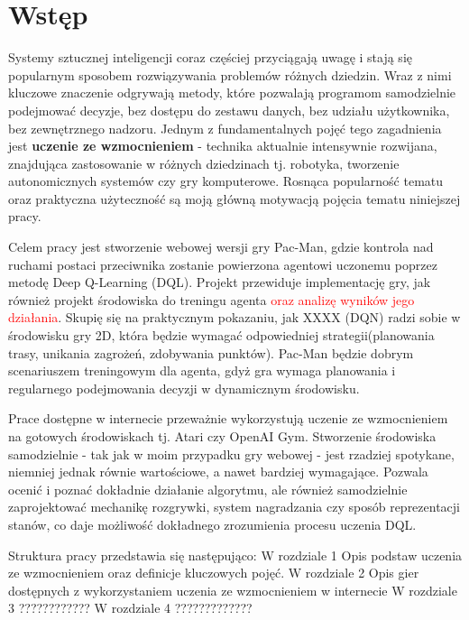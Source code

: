 \documentclass{iiuwb}
\begin{document}
\tableofcontents
\cleardoublepage
\chapter*{Wstęp}
\label{cha:Wstep}

Systemy sztucznej inteligencji coraz częściej przyciągają uwagę i stają się popularnym sposobem rozwiązywania problemów różnych dziedzin. Wraz z nimi kluczowe znaczenie odgrywają metody, które pozwalają programom samodzielnie podejmować decyzje, bez dostępu do zestawu danych, bez udziału użytkownika, bez zewnętrznego nadzoru. Jednym z fundamentalnych pojęć tego zagadnienia jest \textbf{uczenie ze wzmocnieniem} - technika aktualnie intensywnie rozwijana, znajdująca zastosowanie w różnych dziedzinach tj. robotyka, tworzenie autonomicznych systemów czy gry komputerowe. Rosnąca popularność tematu oraz praktyczna użyteczność są moją główną motywacją pojęcia tematu niniejszej pracy.

Celem pracy jest stworzenie webowej wersji gry Pac-Man, gdzie kontrola nad ruchami postaci przeciwnika zostanie powierzona agentowi uczonemu poprzez metodę Deep Q-Learning (DQL). Projekt przewiduje implementację gry, jak również projekt środowiska do treningu agenta \textcolor{red}{oraz analizę wyników jego działania}. Skupię się na praktycznym pokazaniu, jak XXXX (DQN) radzi sobie w środowisku gry 2D, która będzie wymagać odpowiedniej strategii(planowania trasy, unikania zagrożeń, zdobywania punktów). Pac-Man będzie dobrym scenariuszem treningowym dla agenta, gdyż gra wymaga planowania i regularnego podejmowania decyzji w dynamicznym środowisku.

Prace dostępne w internecie przeważnie wykorzystują uczenie ze wzmocnieniem na gotowych środowiskach tj. Atari czy OpenAI Gym. Stworzenie środowiska samodzielnie - tak jak w moim przypadku gry webowej - jest rzadziej spotykane, niemniej jednak równie wartościowe, a nawet bardziej wymagające. Pozwala ocenić i poznać dokładnie działanie algorytmu, ale również samodzielnie zaprojektować mechanikę rozgrywki, system nagradzania czy sposób reprezentacji stanów, co daje możliwość dokładnego zrozumienia procesu uczenia DQL.

Struktura pracy przedstawia się następująco:
W rozdziale 1 Opis podstaw uczenia ze wzmocnieniem oraz definicje kluczowych pojęć.
W rozdziale 2 Opis gier dostępnych z wykorzystaniem uczenia ze wzmocnieniem w internecie
W rozdziale 3 ????????????
W rozdziale 4 ?????????????
\end{document}
